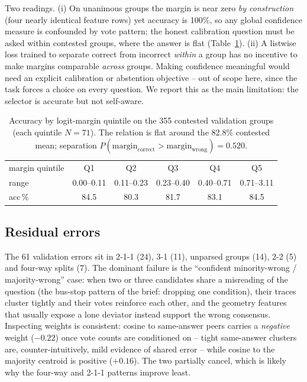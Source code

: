 \documentclass[10pt,a4paper]{article}
\begin{document}
Two readings. (i) On unanimous groups the margin is near zero \emph{by
construction} (four nearly identical feature rows) yet accuracy is 100\%, so
any global confidence measure is confounded by vote pattern; the honest
calibration question must be asked within contested groups, where the answer is
flat (Table~\ref{tab:calibration}). (ii) A listwise loss trained to separate
correct from incorrect \emph{within} a group has no incentive to make margins
comparable \emph{across} groups. Making confidence meaningful would need an
explicit calibration or abstention objective -- out of scope here, since the
task forces a choice on every question. We report this as the main limitation:
the selector is accurate but not self-aware.

\begin{table}[t]
\centering\small
\caption{Accuracy by logit-margin quintile on the 355 contested validation
groups (each quintile $N=71$). The relation is flat around the 82.8\%
contested mean; separation $P(\text{margin}_{\text{correct}} >
\text{margin}_{\text{wrong}}) = 0.520$.}
\label{tab:calibration}
\begin{tabular}{lccccc}
\hline
margin quintile & Q1 & Q2 & Q3 & Q4 & Q5 \\
range & 0.00--0.11 & 0.11--0.23 & 0.23--0.40 & 0.40--0.71 & 0.71--3.11 \\
acc\,\% & 84.5 & 80.3 & 81.7 & 83.1 & 84.5 \\
\hline
\end{tabular}
\end{table}

\subsection{Residual errors}
The 61 validation errors sit in 2-1-1 (24), 3-1 (11), unparsed groups (14),
2-2 (5) and four-way splits (7). The dominant failure is the ``confident
minority-wrong / majority-wrong'' case: when two or three candidates share a
misreading of the question (the bus-stop pattern of the brief: dropping one
condition), their traces cluster tightly and their votes reinforce each other,
and the geometry features that usually expose a lone deviator instead support
the wrong consensus. Inspecting weights is consistent: cosine to same-answer
peers carries a \emph{negative} weight ($-0.22$) once vote counts are
conditioned on -- tight same-answer clusters are, counter-intuitively, mild
evidence of shared error -- while cosine to the majority centroid is positive
($+0.16$). The two partially cancel, which is likely why the four-way and
2-1-1 patterns improve least.
\end{document}
